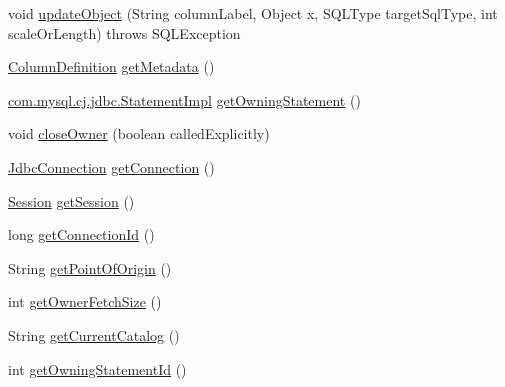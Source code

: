 \begin{DoxyCompactItemize}
\item 
void \mbox{\hyperlink{classcom_1_1mysql_1_1cj_1_1jdbc_1_1result_1_1_result_set_impl_a8851566d2498a8c67efc9ab43f1e3062}{update\+Object}} (String column\+Label, Object x, S\+Q\+L\+Type target\+Sql\+Type, int scale\+Or\+Length)  throws S\+Q\+L\+Exception 
\item 
\mbox{\hyperlink{interfacecom_1_1mysql_1_1cj_1_1protocol_1_1_column_definition}{Column\+Definition}} \mbox{\hyperlink{classcom_1_1mysql_1_1cj_1_1jdbc_1_1result_1_1_result_set_impl_ab8039f083d7598f8a09a8c1850a8cb97}{get\+Metadata}} ()
\item 
\mbox{\hyperlink{classcom_1_1mysql_1_1cj_1_1jdbc_1_1_statement_impl}{com.\+mysql.\+cj.\+jdbc.\+Statement\+Impl}} \mbox{\hyperlink{classcom_1_1mysql_1_1cj_1_1jdbc_1_1result_1_1_result_set_impl_a92c4f04e5def008c6bb83e224652a4e8}{get\+Owning\+Statement}} ()
\item 
void \mbox{\hyperlink{classcom_1_1mysql_1_1cj_1_1jdbc_1_1result_1_1_result_set_impl_ad577270f808aab7fefcdeb04f9b9995a}{close\+Owner}} (boolean called\+Explicitly)
\item 
\mbox{\hyperlink{interfacecom_1_1mysql_1_1cj_1_1jdbc_1_1_jdbc_connection}{Jdbc\+Connection}} \mbox{\hyperlink{classcom_1_1mysql_1_1cj_1_1jdbc_1_1result_1_1_result_set_impl_a78cd466823b475c27688f946746c397b}{get\+Connection}} ()
\item 
\mbox{\hyperlink{interfacecom_1_1mysql_1_1cj_1_1_session}{Session}} \mbox{\hyperlink{classcom_1_1mysql_1_1cj_1_1jdbc_1_1result_1_1_result_set_impl_a0dea8cd7b4abcf189649cd1d2e65f6bc}{get\+Session}} ()
\item 
long \mbox{\hyperlink{classcom_1_1mysql_1_1cj_1_1jdbc_1_1result_1_1_result_set_impl_a8ddd259badcea61d389af97efb5bf7db}{get\+Connection\+Id}} ()
\item 
String \mbox{\hyperlink{classcom_1_1mysql_1_1cj_1_1jdbc_1_1result_1_1_result_set_impl_acc4c2166c7861185dcae5b467bc557ec}{get\+Point\+Of\+Origin}} ()
\item 
int \mbox{\hyperlink{classcom_1_1mysql_1_1cj_1_1jdbc_1_1result_1_1_result_set_impl_adc5df1d46d57d78d7cdd8394eba75389}{get\+Owner\+Fetch\+Size}} ()
\item 
String \mbox{\hyperlink{classcom_1_1mysql_1_1cj_1_1jdbc_1_1result_1_1_result_set_impl_aedb1d44f8766af3d382c7f7637832edc}{get\+Current\+Catalog}} ()
\item 
int \mbox{\hyperlink{classcom_1_1mysql_1_1cj_1_1jdbc_1_1result_1_1_result_set_impl_a2ebdda4d716324f5aeb3435a5c9c7b23}{get\+Owning\+Statement\+Id}} ()
\item 

\end{DoxyCompactItemize}

